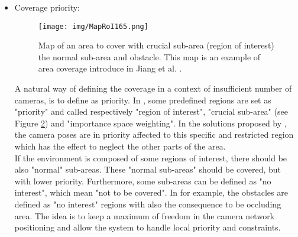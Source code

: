 \begin{itemize}
\begin{figure}[t!]
   \texttt{[image: img/PathToCover[81].png]}
  \caption{The path to cover is illustrate in the work of Nikolaidis et al. \cite{81*nikolaidis2009}. The aim is to is focused on cover a road (walk path) in a small room by using 3 cameras. }\label{fig:pathToCover81}
  \endminipage\hfill
\end{figure}
   The point here is to observe the entire trajectory commonly taken by users (car, pedestrian, …). When the area to cover is a well-known place, the main trajectory taken by the users can be estimated or extracted \cite{27*bodor2005}. If the area to cover is a road, for instance, then the trajectory of the driver is known \cite{14*lu2011}. In this condition, the aim is to cover the common trajectory of the user as presented in  \cite{14*lu2011,27*bodor2005,30*bodor2005,81*nikolaidis2009} (see the Figure \ref{fig:pathToCover81}). The path coverage is interesting due to the restricted area to cover: not an entire area, but only a path within a given area, that can be seen as a priority sub-area. \\
   \item Coverage priority: \\
      \begin{figure}[t!]
\center
{}
   \texttt{[image: img/MapRoI165.png]}
  \caption{Map of an area to cover with crucial sub-area (region of interest) the normal sub-area  and obstacle. This map is an example of area coverage  introduce in  Jiang et al. \cite{165*jiang2010}. }\label{fig:MapRoI165}
  \endminipage\hfill
\end{figure}
   A natural way of defining the coverage in a context of insufficient number of cameras, is to define as priority.
    In \cite{84*xu2011,165*jiang2010,171*horster2006}, some predefined regions are set as "priority" and called respectively "region of interest", "crucial sub-area" (see Figure \ref{fig:MapRoI165}) and "importance space weighting".  In the solutions proposed  by \cite{84*xu2011,165*jiang2010,171*horster2006}, the camera poses are in priority affected to this specific and restricted region which has the effect to neglect the other parts of the area. \\
If the environment is composed of some regions of interest, there should be also "normal" sub-areas. These "normal sub-areas" should be covered, but with lower priority. Furthermore, some  sub-areas can be defined as "no interest", which mean "not to be covered". In \cite{165*jiang2010,171*horster2006} for example, the obstacles are defined as "no interest" regions with also the consequence to  be occluding area. The idea is to keep a maximum of freedom in the camera network positioning and allow the system to handle local priority and constraints.\\

\end{itemize}
